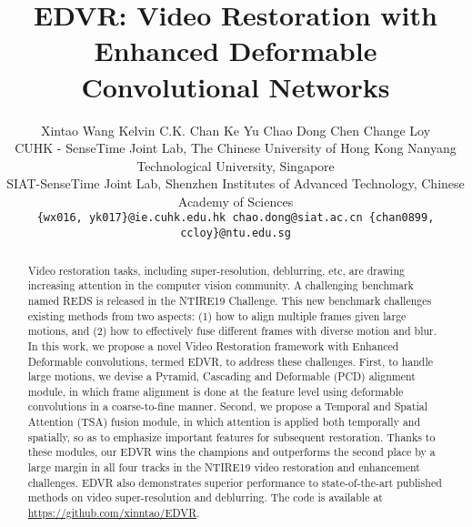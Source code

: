\documentclass[10pt,twocolumn,letterpaper]{article}
\begin{document}
\title{\vspace{-1cm}EDVR: Video Restoration with Enhanced Deformable Convolutional Networks}
\author{
Xintao Wang \hspace{10pt} Kelvin C.K. Chan \hspace{10pt} Ke Yu \hspace{10pt} Chao Dong
	\hspace{10pt}Chen Change Loy\\
	\vspace{-0.15cm}
	\small{CUHK - SenseTime Joint Lab, The Chinese University of Hong Kong} 
\hspace{5pt}
	\small{Nanyang Technological University, Singapore}\\
	\vspace{-0.15cm}
	\small{SIAT-SenseTime Joint Lab, Shenzhen Institutes of Advanced Technology, Chinese Academy of Sciences} \\
	{\tt\small \{wx016, yk017\}@ie.cuhk.edu.hk \hspace{3pt} chao.dong@siat.ac.cn\hspace{3pt} \{chan0899, ccloy\}@ntu.edu.sg}\\
	\vspace{-0.7cm}
}

\maketitle



\vspace{-0.4cm}
\begin{abstract}
\vspace{-0.2cm}
Video restoration tasks, including super-resolution, deblurring, etc, are drawing increasing attention in the computer vision community. A challenging benchmark named REDS is released in the NTIRE19 Challenge. This new benchmark challenges existing methods from two aspects: (1) how to align multiple frames given large motions, and (2) how to effectively fuse different frames with diverse motion and blur. 
In this work, we propose a novel Video Restoration framework with Enhanced Deformable convolutions, termed EDVR, to address these challenges. First, to handle large motions, we devise a Pyramid, Cascading and Deformable (PCD) alignment module, in which frame alignment is done at the feature level using deformable convolutions in a coarse-to-fine manner. Second, we propose a Temporal and Spatial Attention (TSA) fusion module, in which attention is applied both temporally and spatially, so as to emphasize important features for subsequent restoration. 
Thanks to these modules, our EDVR wins the champions and outperforms the second place by a large margin in all four tracks in the NTIRE19 video restoration and enhancement challenges. EDVR also demonstrates superior performance to state-of-the-art published methods on video super-resolution and deblurring.
The code is available at \url{https://github.com/xinntao/EDVR}.
\end{abstract}
\vspace{-0.5cm}
\end{document}
